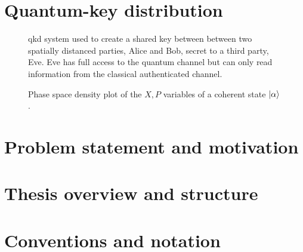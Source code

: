 \section{Quantum-key distribution}


\begin{figure}[htb]
	\centering
	
	\caption{\Gls{qkd} system used to create a shared key between between two spatially distanced parties, Alice and Bob, secret to a third party, Eve. Eve has full access to the quantum channel but can only read information from the classical authenticated channel.}
\end{figure}

\begin{figure}[htb]
	\centering
	
	\caption{Phase space density plot of the $X,P$ variables of a coherent state $\ket{\alpha}$.}
\end{figure}

\section{Problem statement and motivation}


\section{Thesis overview and structure}


\section{Conventions and notation}

